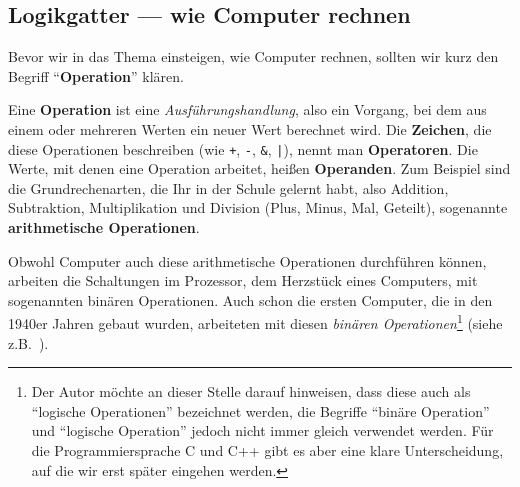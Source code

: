 \subsection{Logikgatter — wie Computer rechnen}
\label{sec:etwas-mathematik:binäre-operationen}

Bevor wir in das Thema einsteigen, wie Computer rechnen, sollten wir kurz den 
Begriff ``\textbf{Operation}'' klären.

Eine \textbf{Operation} ist eine \emph{Ausführungshandlung}, also ein Vorgang, 
bei dem aus einem oder mehreren Werten ein neuer Wert berechnet wird. Die 
\textbf{Zeichen}, die diese Operationen beschreiben (wie \texttt{+}, \texttt{-}, 
\texttt{\&}, \texttt{|}), nennt man \textbf{Operatoren}. Die Werte, mit denen 
eine Operation arbeitet, heißen \textbf{Operanden}. Zum Beispiel sind die 
Grundrechenarten, die Ihr in der Schule gelernt habt, also Addition, Subtraktion, 
Multiplikation und Division (Plus, Minus, Mal, Geteilt), sogenannte 
\textbf{arithmetische Operationen}. 

Obwohl Computer auch diese arithmetische Operationen durchführen können, arbeiten 
die Schaltungen im Prozessor, dem Herzstück eines Computers, mit sogenannten 
binären Operationen. Auch schon die ersten Computer, die in den 1940er Jahren 
gebaut wurden, arbeiteten mit diesen \emph{binären Operationen}\footnote{%
  Der Autor möchte an dieser Stelle darauf hinweisen, dass diese auch als ``logische
  Operationen'' bezeichnet werden, die Begriffe ``binäre Operation'' und 
  ``logische Operation'' jedoch nicht immer gleich verwendet  werden. Für die Programmiersprache 
  C und C++ gibt es aber eine klare Unterscheidung, auf die wir erst später eingehen werden.} 
(siehe z.B.\ \cite{wikipedia:computer}).

